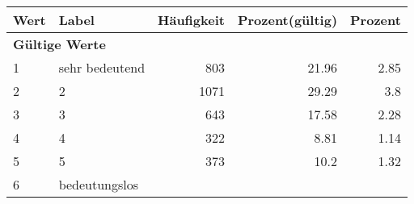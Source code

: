      \begin{longtable}{lXrrr}
     \toprule
     \textbf{Wert} & \textbf{Label} & \textbf{Häufigkeit} & \textbf{Prozent(gültig)} & \textbf{Prozent} \\
     \endhead
     \midrule
     \multicolumn{5}{l}{\textbf{Gültige Werte}}\\

     1 &
     \multicolumn{1}{X}{ sehr bedeutend   } &


       \num{803} &
       \num[round-mode=places,round-precision=2]{21.96} &
         \num[round-mode=places,round-precision=2]{2.85} \\

     2 &
     \multicolumn{1}{X}{ 2   } &


       \num{1071} &
       \num[round-mode=places,round-precision=2]{29.29} &
         \num[round-mode=places,round-precision=2]{3.8} \\

     3 &
     \multicolumn{1}{X}{ 3   } &


       \num{643} &
       \num[round-mode=places,round-precision=2]{17.58} &
         \num[round-mode=places,round-precision=2]{2.28} \\

     4 &
     \multicolumn{1}{X}{ 4   } &


       \num{322} &
       \num[round-mode=places,round-precision=2]{8.81} &
         \num[round-mode=places,round-precision=2]{1.14} \\

     5 &
     \multicolumn{1}{X}{ 5   } &


       \num{373} &
       \num[round-mode=places,round-precision=2]{10.2} &
         \num[round-mode=places,round-precision=2]{1.32} \\

     6 &
     \multicolumn{1}{X}{ bedeutungslos   } &



\end{longtable}
